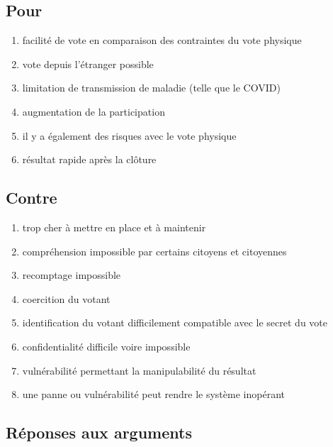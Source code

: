 \documentclass[../report]{subfiles}
\begin{document}
\newpage
\begin{multicols}{2}
\subsection{Pour}\label{sec:diff-meth:args:pour}
\begin{enumerate}
	\item facilité de vote en comparaison des contraintes du vote physique
	\item vote depuis l'étranger possible
	\item limitation de transmission de maladie (telle que le COVID)
	\item augmentation de la participation
	\item il y a également des risques avec le vote physique
	\item résultat rapide après la clôture
\end{enumerate}
\newcolumn
\subsection{Contre}\label{sec:diff-meth:args:contre}
\begin{enumerate}
	\item trop cher à mettre en place et à maintenir
	\item compréhension impossible par certains citoyens et citoyennes
	\item recomptage impossible
	\item coercition du votant
	\item identification du votant difficilement compatible avec le secret du vote
	\item confidentialité difficile voire impossible
	\item vulnérabilité permettant la manipulabilité du résultat
	\item une panne ou vulnérabilité peut rendre le système inopérant
\end{enumerate}
\end{multicols}

\subsection{Réponses aux arguments}
\end{document}
